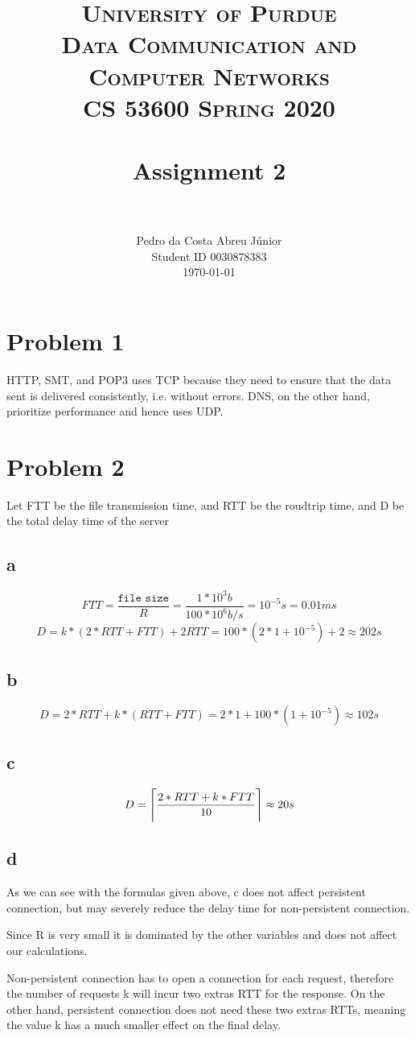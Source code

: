 \documentclass[paper=a4, fontsize=11pt]{scrartcl}
\title{
		\usefont{OT1}{bch}{b}{n}
		\normalfont \normalsize \textsc{University of Purdue\\
      Data Communication and Computer Networks\\
      CS 53600 Spring 2020} \\ [25pt]
		\horrule{0.5pt} \\[0.4cm]
		\huge Assignment 2\\
		\horrule{2pt} \\[0.5cm]
}
\author{
		\normalfont\normalsize Pedro da Costa Abreu Júnior\\ [-5pt]
    \normalsize Student ID 0030878383\\[-5pt]
    \normalsize \today
}
\date{}
\numberwithin{equation}{section}		%
\numberwithin{figure}{section}			%
\numberwithin{table}{section}				%
\DeclarePairedDelimiter{\ceil}{\lceil}{\rceil}
\begin{document}
\maketitle

\section*{Problem 1}
HTTP, SMT, and POP3 uses TCP because they need to ensure that the data sent is delivered consistently, i.e. without errors.
DNS, on the other hand, prioritize performance and hence uses UDP.


\section*{Problem 2}
Let FTT be the file transmission time, and RTT be the roudtrip time, and D be the total delay time of the server
\subsection*{a}

$$FTT = \frac{\texttt{file size}}{R} = \frac{1 * 10^{3}b}{100 * 10^{6}b/s} = 10^{-5}s = 0.01ms$$
$$D = k * (2 * RTT + FTT) + 2 RTT = 100 * (2 * 1 + 10^{-5}) + 2 \approx 202s$$

\subsection*{b}
$$D = 2 * RTT + k * (RTT + FTT) = 2 * 1 + 100 * (1+10^{-5}) \approx 102s$$

\subsection*{c}
$$D = \ceil[\Bigg]{\frac{2 * RTT + k * FTT}{10}} \approx 20s$$

\subsection*{d}
As we can see with the formulas given above, c does not affect persistent connection, but may severely reduce the delay time for non-persistent connection.

Since R is very small it is dominated by the other variables and does not affect our calculations.

Non-persistent connection has to open a connection for each request, therefore the number of requests k will incur two extras RTT for the response. On the other hand, persistent connection does not need these two extras RTTs, meaning the value k has a much smaller effect on the final delay.
\end{document}

